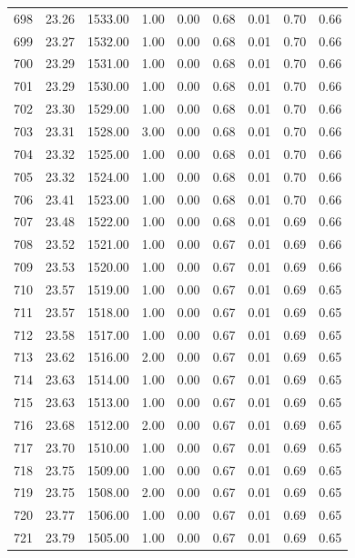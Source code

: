 \documentclass{article}\usepackage[]{graphicx}\usepackage[]{color}
\begin{document}
\begin{longtable}{rrrrrrrrr}
  698 & 23.26 & 1533.00 & 1.00 & 0.00 & 0.68 & 0.01 & 0.70 & 0.66 \\ 
  699 & 23.27 & 1532.00 & 1.00 & 0.00 & 0.68 & 0.01 & 0.70 & 0.66 \\ 
  700 & 23.29 & 1531.00 & 1.00 & 0.00 & 0.68 & 0.01 & 0.70 & 0.66 \\ 
  701 & 23.29 & 1530.00 & 1.00 & 0.00 & 0.68 & 0.01 & 0.70 & 0.66 \\ 
  702 & 23.30 & 1529.00 & 1.00 & 0.00 & 0.68 & 0.01 & 0.70 & 0.66 \\ 
  703 & 23.31 & 1528.00 & 3.00 & 0.00 & 0.68 & 0.01 & 0.70 & 0.66 \\ 
  704 & 23.32 & 1525.00 & 1.00 & 0.00 & 0.68 & 0.01 & 0.70 & 0.66 \\ 
  705 & 23.32 & 1524.00 & 1.00 & 0.00 & 0.68 & 0.01 & 0.70 & 0.66 \\ 
  706 & 23.41 & 1523.00 & 1.00 & 0.00 & 0.68 & 0.01 & 0.70 & 0.66 \\ 
  707 & 23.48 & 1522.00 & 1.00 & 0.00 & 0.68 & 0.01 & 0.69 & 0.66 \\ 
  708 & 23.52 & 1521.00 & 1.00 & 0.00 & 0.67 & 0.01 & 0.69 & 0.66 \\ 
  709 & 23.53 & 1520.00 & 1.00 & 0.00 & 0.67 & 0.01 & 0.69 & 0.66 \\ 
  710 & 23.57 & 1519.00 & 1.00 & 0.00 & 0.67 & 0.01 & 0.69 & 0.65 \\ 
  711 & 23.57 & 1518.00 & 1.00 & 0.00 & 0.67 & 0.01 & 0.69 & 0.65 \\ 
  712 & 23.58 & 1517.00 & 1.00 & 0.00 & 0.67 & 0.01 & 0.69 & 0.65 \\ 
  713 & 23.62 & 1516.00 & 2.00 & 0.00 & 0.67 & 0.01 & 0.69 & 0.65 \\ 
  714 & 23.63 & 1514.00 & 1.00 & 0.00 & 0.67 & 0.01 & 0.69 & 0.65 \\ 
  715 & 23.63 & 1513.00 & 1.00 & 0.00 & 0.67 & 0.01 & 0.69 & 0.65 \\ 
  716 & 23.68 & 1512.00 & 2.00 & 0.00 & 0.67 & 0.01 & 0.69 & 0.65 \\ 
  717 & 23.70 & 1510.00 & 1.00 & 0.00 & 0.67 & 0.01 & 0.69 & 0.65 \\ 
  718 & 23.75 & 1509.00 & 1.00 & 0.00 & 0.67 & 0.01 & 0.69 & 0.65 \\ 
  719 & 23.75 & 1508.00 & 2.00 & 0.00 & 0.67 & 0.01 & 0.69 & 0.65 \\ 
  720 & 23.77 & 1506.00 & 1.00 & 0.00 & 0.67 & 0.01 & 0.69 & 0.65 \\ 
  721 & 23.79 & 1505.00 & 1.00 & 0.00 & 0.67 & 0.01 & 0.69 & 0.65 \\ 

\end{longtable}
\end{document}
